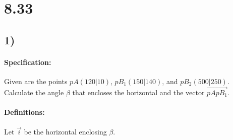 \documentclass{article}
\begin{document}
\section*{8.33}

\def\pAX{120}
\def\pAY{10}
\def\pBOneX{150}
\def\pBOneY{140}
\def\pBTwoX{500}
\def\pBTwoY{250}
\def\pA{$pA(\pAX|\pAY)$}
\def\pBOne{$pB_1(\pBOneX|\pBOneY)$}
\def\pBTwo{$pB_2(\pBTwoX|\pBTwoY)$}

\def\vA{\begin{pmatrix}
    \pAX \\  
    \pAY 
\end{pmatrix}}
\def\vBOne{\begin{pmatrix}
    \pBOneX \\  
    \pBOneY 
\end{pmatrix}}
\def\vBTwo{\begin{pmatrix}
    \pBTwoX \\  
    \pBTwoY 
\end{pmatrix}}

\subsection*{1)}

\def\vABX{\pgfmathparse{\pBOneX - \pAX}\pgfmathresult}
\def\vABY{\pgfmathparse{\pBOneY - \pAY}\pgfmathresult}
\def\vAB{\begin{pmatrix}
    \vABX \\ 
    \vABY 
\end{pmatrix}}

\def\vI{\begin{pmatrix}
    1 \\
    0
\end{pmatrix}}

\paragraph{Specification:}
Given are the points \pA, \pBOne, and \pBTwo. Calculate the angle $\beta$ that encloses the 
horizontal and the vector $\vec{pApB_1}$.

\paragraph{Definitions:} 
Let $\vec{i}$ be the horizontal enclosing $\beta$.
\end{document}
